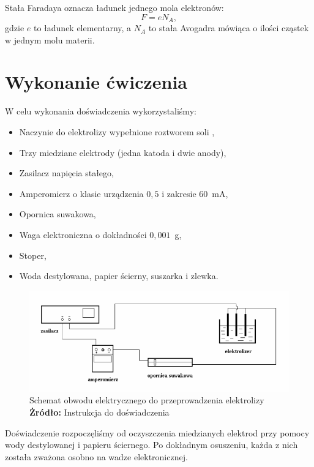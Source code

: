 \documentclass[12pt,a4paper]{article}
\numberwithin{equation}{section}
\newcommand*{\captionsource}[2]{%
	\caption[{#1}]{%
		#1%
		\\\hspace{\linewidth}%
		\textbf{Żródło:} #2%
	}%
}
\begin{document}
Stała Faradaya oznacza ładunek jednego mola elektronów:
\begin{equation}
	F = eN_A,
	\label{eq:faraday3}
\end{equation}
gdzie $e$ to ładunek elementarny, a $N_A$ to stała Avogadra mówiąca o ilości cząstek w jednym molu materii.

\section{Wykonanie ćwiczenia}
\label{sec:2}

W celu wykonania doświadczenia wykorzystaliśmy:
\begin{itemize}
	\item Naczynie do elektrolizy wypełnione roztworem soli ,
	\item Trzy miedziane elektrody (jedna katoda i dwie anody),
	\item Zasilacz napięcia stałego,
	\item Amperomierz o klasie urządzenia $0,5$ i zakresie $60$~mA,
	\item Opornica suwakowa,
	\item Waga elektroniczna o dokładności $0,001$~g,
	\item Stoper,
	\item Woda destylowana, papier ścierny, suszarka i zlewka.
\end{itemize}

\begin{figure}[!htb]
	\includegraphics[width=1\textwidth]{img/elektroliza.png} 
	\captionsource{Schemat obwodu elektrycznego do przeprowadzenia elektrolizy}{Instrukcja do doświadczenia}
	\label{fig:img1}
\end{figure}

Doświadczenie rozpoczęliśmy od oczyszczenia miedzianych elektrod przy pomocy wody destylowanej i papieru ściernego. Po dokładnym osuszeniu, każda z nich została zważona osobno na wadze elektronicznej.
\end{document}
